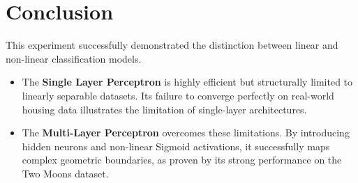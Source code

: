 \documentclass[11pt]{article}
\begin{document}
\section{Conclusion}
This experiment successfully demonstrated the distinction between linear and non-linear classification models.
\begin{itemize}
    \item The \textbf{Single Layer Perceptron} is highly efficient but structurally limited to linearly separable datasets. Its failure to converge perfectly on real-world housing data illustrates the limitation of single-layer architectures.
    \item The \textbf{Multi-Layer Perceptron} overcomes these limitations. By introducing hidden neurons and non-linear Sigmoid activations, it successfully maps complex geometric boundaries, as proven by its strong performance on the Two Moons dataset.
\end{itemize}


\renewcommand{\bibname}{References}

\end{document}
